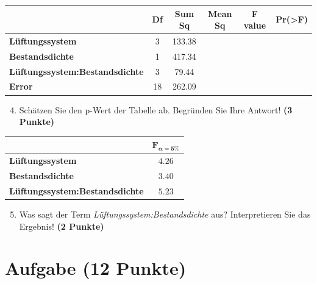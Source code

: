 \documentclass[a4paper, 9pt]{scrartcl}\usepackage[]{graphicx}\usepackage[]{xcolor}
\begin{document}
\vspace{1Ex}

\begin{center}
  \Large
  \begin{tabular}{lccccc}
  \toprule
     & \textbf{Df} & \textbf{Sum Sq} & \textbf{Mean Sq} & \textbf{F value} & \textbf{Pr(>F)} \strut\\
    \midrule
   \textbf{Lüftungssystem}  & 3 & 133.38 &  &  &  \strut\\
    \textbf{Bestandsdichte}  & 1 & 417.34 &  &  &  \strut\\
    \textbf{Lüftungssystem:Bestandsdichte}  & 3 & 79.44 &  &  &  \strut\\
   \textbf{Error}  & 18 & 262.09 &  &  &  \strut\\
\bottomrule
  \end{tabular}
\end{center}

\vspace{1Ex}

\begin{enumerate}
  \setcounter{enumi}{3}
\item Schätzen Sie den p-Wert der Tabelle ab. Begründen Sie Ihre Antwort! \textbf{(3 Punkte)}
\end{enumerate}
  
\begin{center}
    \Large
\begin{tabular}{lc}
  \toprule
     & $\boldsymbol{F_{\alpha = 5\%}}$ \\
\midrule
  \textbf{Lüftungssystem} & $4.26$ \\
  \textbf{Bestandsdichte} & $3.40$ \\
  \textbf{Lüftungssystem:Bestandsdichte} & $5.23$ \\
  \bottomrule
  \end{tabular}
\end{center}

\begin{enumerate}
  \setcounter{enumi}{4}
\item Was sagt der Term \textit{Lüftungssystem:Bestandsdichte} aus? Interpretieren Sie das Ergebnis! \textbf{(2 Punkte)}
\end{enumerate}
 
\clearpage

\section{Aufgabe \hfill (12 Punkte)}
\end{document}

